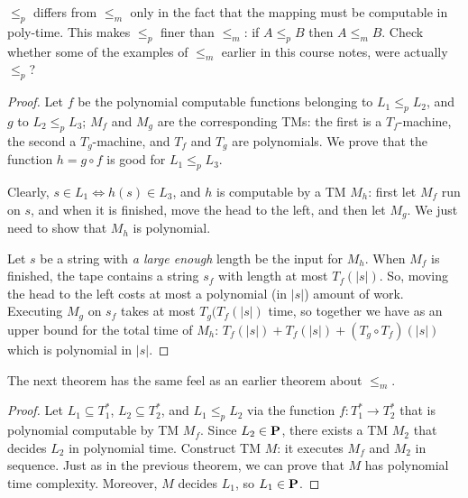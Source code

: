 $\leq_p$ differs from $\leq_m$ only in the fact that the mapping must
be computable in poly-time. This makes $\leq_p$ finer than $\leq_m$:
if $A \leq_p B$ then $A \leq_m B$. Check whether some of the examples
of $\leq_m$ earlier in this course notes, were actually $\leq_p$?



\begin{proof}   
Let $f$ be the polynomial computable functions belonging to $L_1
\leq_p L_2$, and $g$ to $L_2 \leq_p L_3$; $M_f$ and $M_g$ are the
corresponding TMs: the first is a $T_f$-machine, the second a
$T_g$-machine, and $T_f$ and $T_g$ are polynomials. We prove that
%
the function $h = g\circ f$ is good for $L_1 \leq_p L_3$.

Clearly, $s \in L_1 \Leftrightarrow h(s) \in L_3$, and $h$ is
computable by a TM $M_h$: first let $M_f$ run on $s$, and when it is
finished, move the head to the left, and then let $M_g$. We just need
to show that $M_h$ is polynomial.

Let $s$ be a string with {\em a large enough} length be the input for
$M_h$. When $M_f$ is finished, the tape contains a string $s_f$ with
length at most $T_f(|s|)$. So, moving the head to the left costs at
most a polynomial (in $|s|$) amount of work. Executing $M_g$ on $s_f$
takes at most $T_g(T_f(|s|)$ time, so together we have as an upper
bound for the total time of $M_h$:
%
$T_f(|s|) + T_f(|s|) + (T_g \circ T_f)(|s|)$ which is polynomial in
$|s|$.
\end{proof}


The next theorem has the same feel as an earlier theorem about
$\leq_m$.


\begin{proof} Let $L_1\subseteq T_1^*$, $L_2\subseteq T_2^*$, and $L_1
\leq_p L_2$ via the function $f:T_1^*\rightarrow T_2^*$ that is
polynomial computable by TM $M_f$. Since $L_2\in \P$, there exists a
TM $M_2$ that decides $L_2$ in polynomial time. Construct TM $M$: it
executes $M_f$ and $M_2$ in sequence. Just as in the previous theorem,
we can prove that $M$ has polynomial time complexity. Moreover, $M$
decides $L_1$, so $L_1\in \P$.
\end{proof}

